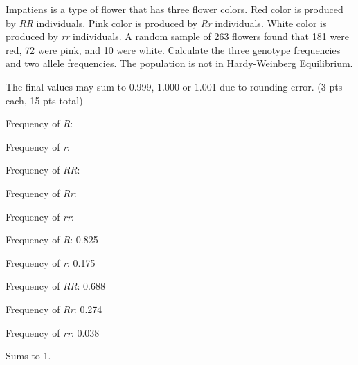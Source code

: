 
\question[15]
Impatiens is a type of flower that has three flower colors. Red color is produced by \textit{RR} individuals. Pink color is produced by \textit{Rr} individuals. White color is produced by \textit{rr} individuals. A random sample of 263 flowers found that 181 were red, 72 were pink, and 10 were white. Calculate the three genotype frequencies and two allele frequencies. The population is not in Hardy-Weinberg Equilibrium.

 The final values may sum to 0.999, 1.000 or 1.001 due to rounding error. (3 pts each, 15 pts total)

\vspace{2\baselineskip}
Frequency of \textit{R}:

\vspace{2\baselineskip}
Frequency of \textit{r}:

\vspace{2\baselineskip}
Frequency of \textit{RR}:

\vspace{2\baselineskip}
Frequency of \textit{Rr}:

\vspace{2\baselineskip}
Frequency of \textit{rr}: 

\begin{solution}

\vspace{1\baselineskip}
Frequency of \textit{R}: 0.825

\vspace{1\baselineskip}
Frequency of \textit{r}: 0.175

\vspace{1\baselineskip}
Frequency of \textit{RR}: 0.688

\vspace{1\baselineskip}
Frequency of \textit{Rr}: 0.274

\vspace{1\baselineskip}
Frequency of \textit{rr}: 0.038

\vspace{\baselineskip}
Sums to 1.
\end{solution}